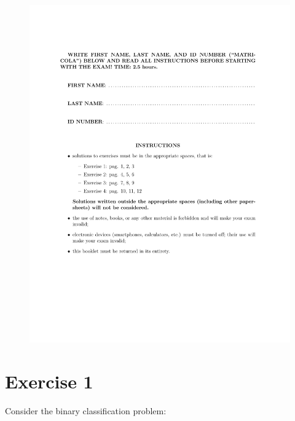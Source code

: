\documentclass[a4paper,11pt,oneside]{book}
\begin{document}
\begin{figure}[H]
\begin{minipage}{0.45\textwidth}
        \includegraphics[width=\textwidth,page=12]{images/4_Sept_2019.pdf}
    \end{minipage}
\end{figure}

\clearpage
\section{Exercise 1}
Consider the binary classification problem:
\end{document}
